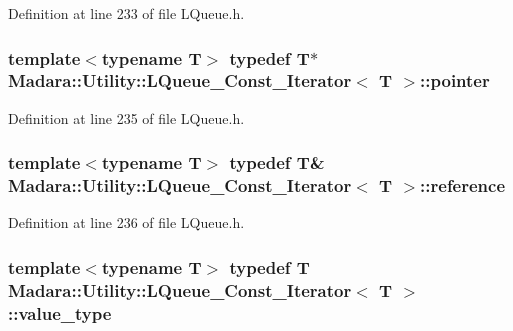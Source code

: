 Definition at line 233 of file LQueue.h.

\hypertarget{classMadara_1_1Utility_1_1LQueue__Const__Iterator_ade1b6029ddaed5aaf696a6ac9c78120c}{
\subsubsection[{pointer}]{\setlength{\rightskip}{0pt plus 5cm}template$<$typename T$>$ typedef T$\ast$ {\bf Madara::Utility::LQueue\_\-Const\_\-Iterator}$<$ T $>$::{\bf pointer}}}
\label{d3/db7/classMadara_1_1Utility_1_1LQueue__Const__Iterator_ade1b6029ddaed5aaf696a6ac9c78120c}


Definition at line 235 of file LQueue.h.

\hypertarget{classMadara_1_1Utility_1_1LQueue__Const__Iterator_a8ee9751dba758e23a5d181272918b773}{
\subsubsection[{reference}]{\setlength{\rightskip}{0pt plus 5cm}template$<$typename T$>$ typedef T\& {\bf Madara::Utility::LQueue\_\-Const\_\-Iterator}$<$ T $>$::{\bf reference}}}
\label{d3/db7/classMadara_1_1Utility_1_1LQueue__Const__Iterator_a8ee9751dba758e23a5d181272918b773}


Definition at line 236 of file LQueue.h.

\hypertarget{classMadara_1_1Utility_1_1LQueue__Const__Iterator_abca6357aaa2e6cddb2cd41716d92b8d8}{
\subsubsection[{value\_\-type}]{\setlength{\rightskip}{0pt plus 5cm}template$<$typename T$>$ typedef T {\bf Madara::Utility::LQueue\_\-Const\_\-Iterator}$<$ T $>$::{\bf value\_\-type}}}
\label{d3/db7/classMadara_1_1Utility_1_1LQueue__Const__Iterator_abca6357aaa2e6cddb2cd41716d92b8d8}


